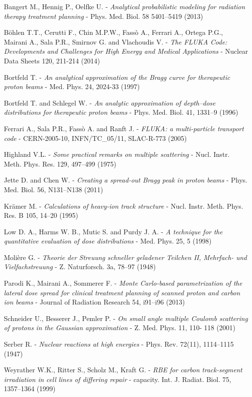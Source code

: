 \documentclass[12pt, a4paper, twoside]{book}
\begin{document}
\begin{thebibliography}{99}

Bangert M., Hennig P., Oelfke U. -
\emph{Analytical probabilistic modeling for radiation therapy treatment planning} - 
Phys. Med. Biol. 58 5401–5419 (2013)

Böhlen T.T., Cerutti F., Chin M.P.W., Fassò A., Ferrari  A., Ortega P.G., Mairani A., Sala P.R., Smirnov G. and Vlachoudis V. -
\emph{The FLUKA Code: Developments and Challenges for High Energy and Medical Applications} -
Nuclear Data Sheets 120, 211-214 (2014) 

Bortfeld T. -
\emph{An analytical approximation of the Bragg curve for therapeutic proton beams} -
Med. Phys. 24, 2024-33 (1997)

Bortfeld T. and Schlegel W. -
\emph{An analytic approximation of depth–dose distributions for therapeutic proton beams} -
Phys. Med. Biol. 41, 1331–9 (1996)

Ferrari A., Sala P.R., Fassò A. and Ranft J. -
\emph{FLUKA: a multi-particle transport code} -
CERN-2005-10, INFN/TC\_05/11, SLAC-R-773 (2005)

Highland V.L. -
\emph{Some practical remarks on multiple scattering} -
Nucl. Instr. Meth. Phys. Res. 129, 497–499 (1975)

Jette D. and Chen W. - 
\emph{Creating a spread-out Bragg peak in proton beams} -
Phys. Med. Biol. 56, N131–N138 (2011)

Krämer M. - 
\emph{Calculations of heavy-ion track structure} - 
Nucl. Instr. Meth. Phys. Res. B 105, 14–20 (1995)

Low D. A., Harms W. B., Mutic S. and Purdy J. A. -
\emph{A technique for the quantitative evaluation of dose distributions} -
Med. Phys. 25, 5 (1998)

Molière G. -
\emph{Theorie der Streuung schneller geladener Teilchen II, Mehrfach- und Vielfachstreuung} - 
Z. Naturforsch. 3a, 78–97 (1948)

Parodi K., Mairani A., Sommerer F. -
\emph{Monte Carlo-based parametrization of the lateral dose spread for clinical treatment planning of scanned proton and carbon ion beams} -
Journal of Radiation Research 54, i91–i96 (2013)

Schneider U., Besserer J., Pemler P. - 
\emph{On small angle multiple Coulomb scattering of protons in the Gaussian approximation} - 
Z. Med. Phys. 11,  110- 118 (2001)

Serber R. - 
\emph{Nuclear reactions at high energies} -
Phys. Rev. 72(11), 1114–1115 (1947)

Weyrather W.K., Ritter S., Scholz M., Kraft G. - 
\emph{RBE for carbon track-segment irradiation in cell lines of differing repair} -
capacity. Int. J. Radiat. Biol. 75, 1357–1364 (1999)






\end{thebibliography}
\end{document}
